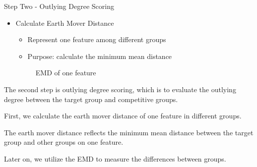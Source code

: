 \documentclass[
size=14pt,
paper=smartboard,  %
mode=present, 		%
display=slides, 	%
style=tuliplab,  	%
pauseslide,
fleqn,leqno]{powerdot}
\begin{document}
\begin{slide}{Step Two - Outlying Degree Scoring}
	\begin{itemize}
		\item
		Calculate Earth Mover Distance
		
		\begin{itemize}
			\item
			Represent one feature among different groups
			
			\item
			Purpose: calculate the minimum mean distance
		\end{itemize}
		
		\begin{figure}
			\caption{EMD of one feature}\label{EMD}
		\end{figure}
	\end{itemize}
	
	\begin{note}
		The second step is outlying degree scoring,
		which is to evaluate the outlying degree between the target group and competitive groups.
		
		First,
		we calculate the earth mover distance of one feature in different groups.
		
		The earth mover distance reflects the minimum mean distance between
		the target group and other groups on one feature.
		
		Later on,
		we utilize the EMD to measure the differences between groups.
	\end{note}
	
\end{slide}
\end{document}
